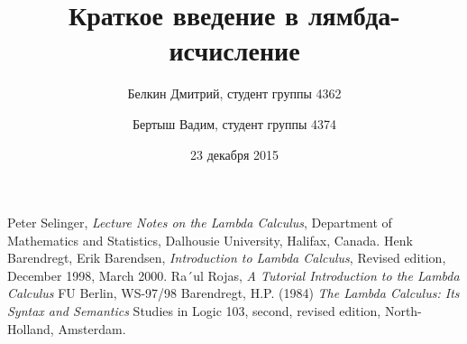 \documentclass{article}
\begin{document}
\title{Краткое введение в лямбда-исчисление}
\author{Белкин Дмитрий, студент группы 4362
\and Бертыш Вадим, студент группы 4374}
\date{23 декабря 2015}
\maketitle
\newpage


\newpage

\newpage




\newpage
\begin{thebibliography}{9}
	Peter Selinger,
	\emph{Lecture Notes on the Lambda Calculus},
	Department of Mathematics and Statistics,
	Dalhousie University,
	Halifax,
	Canada.
	Henk Barendregt,
	Erik Barendsen,
	\emph{Introduction to Lambda Calculus},
	Revised edition,
	December 1998,
	March 2000.
	Ra´ul Rojas,
	\emph{A Tutorial Introduction to the Lambda Calculus}
	FU Berlin, WS-97/98
	Barendregt, H.P. (1984)
	\emph{The Lambda Calculus: Its Syntax and Semantics}
	Studies in Logic 103, second, revised edition, North-Holland, Amsterdam.
\end{thebibliography}
\end{document}
